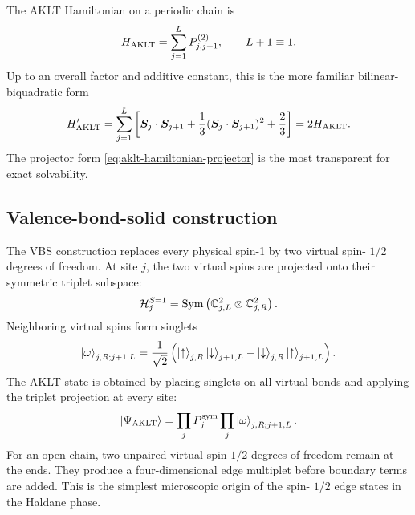 The AKLT Hamiltonian on a periodic chain is
\begin{equation}
\label{eq:aklt-hamiltonian-projector}
    H_{\rm AKLT}
    =
    \sum_{j=1}^{L} P_{j,j+1}^{(2)},
    \qquad
    L+1\equiv1 .
\end{equation}
Up to an overall factor and additive constant, this is the more familiar
bilinear-biquadratic form
\begin{equation}
\label{eq:aklt-hamiltonian-bilinear-biquadratic}
    H_{\rm AKLT}'
    =
    \sum_{j=1}^{L}
    \left[
        \bm S_j\cdot\bm S_{j+1}
        +\frac13(\bm S_j\cdot\bm S_{j+1})^2
        +\frac23
    \right]
    =
    2H_{\rm AKLT} .
\end{equation}
The projector form \cref{eq:aklt-hamiltonian-projector} is the most transparent
for exact solvability.

\subsection{Valence-bond-solid construction}
\label{subsec:aklt-vbs-construction}

The VBS construction replaces every physical spin-1 by two virtual spin-
\(1/2\) degrees of freedom.  At site \(j\), the two virtual spins are projected
onto their symmetric triplet subspace:
\begin{equation}
\label{eq:spin-one-as-symmetric-two-spin-half}
    \mathcal{H}^{S=1}_j
    =
    \operatorname{Sym}
    \left(
        \mathbb{C}^2_{j,L}\otimes\mathbb{C}^2_{j,R}
    \right).
\end{equation}
Neighboring virtual spins form singlets
\begin{equation}
\label{eq:virtual-singlet}
    \left|\omega\right\rangle_{j,R;j+1,L}
    =
    \frac{1}{\sqrt2}
    \left(
        \left|\uparrow\right\rangle_{j,R}\left|\downarrow\right\rangle_{j+1,L}
        -
        \left|\downarrow\right\rangle_{j,R}\left|\uparrow\right\rangle_{j+1,L}
    \right).
\end{equation}
The AKLT state is obtained by placing singlets on all virtual bonds and applying
the triplet projection at every site:
\begin{equation}
\label{eq:aklt-vbs-state}
    \left|\Psi_{\rm AKLT}\right\rangle
    =
    \prod_j P^{\rm sym}_j
    \prod_j
    \left|\omega\right\rangle_{j,R;j+1,L} .
\end{equation}
For an open chain, two unpaired virtual spin-\(1/2\) degrees of freedom remain
at the ends.  They produce a four-dimensional edge multiplet before boundary
terms are added.  This is the simplest microscopic origin of the spin-
\(1/2\) edge states in the Haldane phase.

